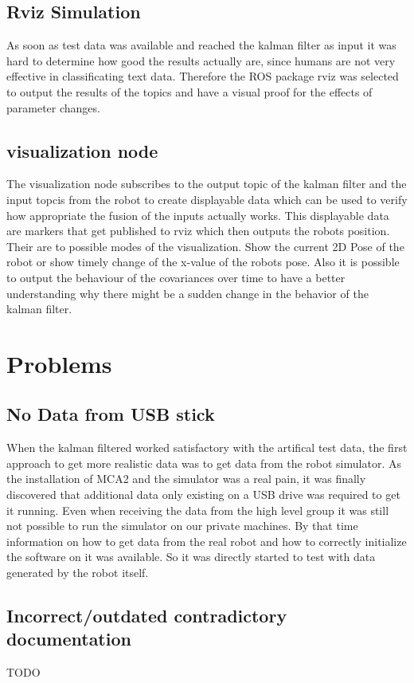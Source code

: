 \subsection{Rviz Simulation}
As soon as test data was available and reached the kalman filter as input it was hard to determine how good the results actually are, since humans are not very effective in classificating text data. Therefore the ROS package rviz was selected to output the results of the topics and have a visual proof for the effects of parameter changes.
\subsection{visualization node}
The visualization node subscribes to the output topic of the kalman filter and the input topcis from the robot to create displayable data which can be used to verify how appropriate the fusion of the inputs actually works. This displayable data are markers that get published to rviz which then outputs the robots position. Their are to possible modes of the visualization. Show the current 2D Pose of the robot or show timely change of the x-value of the robots pose. Also it is possible to output the behaviour of the covariances over time to have a better understanding why there might be a sudden change in the behavior of the kalman filter.
\section{Problems}
\subsection{No Data from USB stick}
When the kalman filtered worked satisfactory with the artifical test data, the first approach to get more realistic data was to get data from the robot simulator. As the installation of MCA2 and the simulator was a real pain, it was finally discovered that additional data only existing on a USB drive was required to get it running. Even when receiving the data from the high level group it was still not possible to run the simulator on our private machines. By that time information on how to get data from the real robot and how to correctly initialize the software on it was available. So it was directly started to test with data generated by the robot itself.
\subsection{Incorrect/outdated contradictory documentation}
TODO
